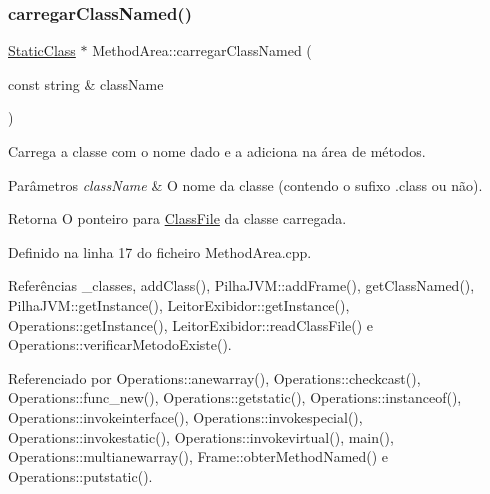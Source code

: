 \subsubsection{\texorpdfstring{carregar\+Class\+Named()}{carregarClassNamed()}}
{\footnotesize\ttfamily \hyperlink{classStaticClass}{Static\+Class} $\ast$ Method\+Area\+::carregar\+Class\+Named (\begin{DoxyParamCaption}\item[{const string \&}]{class\+Name }\end{DoxyParamCaption})}



Carrega a classe com o nome dado e a adiciona na área de métodos. 


\begin{DoxyParams}{Parâmetros}
{\em class\+Name} & O nome da classe (contendo o sufixo .class ou não). \\
\hline
\end{DoxyParams}
\begin{DoxyReturn}{Retorna}
O ponteiro para {\ttfamily \hyperlink{classClassFile}{Class\+File}} da classe carregada. 
\end{DoxyReturn}


Definido na linha 17 do ficheiro Method\+Area.\+cpp.



Referências \+\_\+classes, add\+Class(), Pilha\+J\+V\+M\+::add\+Frame(), get\+Class\+Named(), Pilha\+J\+V\+M\+::get\+Instance(), Leitor\+Exibidor\+::get\+Instance(), Operations\+::get\+Instance(), Leitor\+Exibidor\+::read\+Class\+File() e Operations\+::verificar\+Metodo\+Existe().



Referenciado por Operations\+::anewarray(), Operations\+::checkcast(), Operations\+::func\+\_\+new(), Operations\+::getstatic(), Operations\+::instanceof(), Operations\+::invokeinterface(), Operations\+::invokespecial(), Operations\+::invokestatic(), Operations\+::invokevirtual(), main(), Operations\+::multianewarray(), Frame\+::obter\+Method\+Named() e Operations\+::putstatic().

